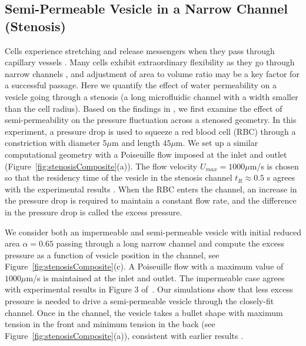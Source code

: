 \documentclass[9pt,twocolumn,twoside,lineno]{pnas-new}
\begin{document}
\subsection*{Semi-Permeable Vesicle in a Narrow Channel (Stenosis)}
Cells experience stretching and release messengers when they pass through capillary vessels \cite{Wan2008_PNAS,ForsythWan2011_PNAS,Pak2015_PNAS}.
Many cells exhibit extraordinary flexibility as they go through narrow channels \cite{AuStoreyMoore2016_PNAS}, and adjustment of area to volume ratio may be a key factor for a successful passage.
Here we quantify the effect of water permeability on a vesicle going through a stenosis (a long microfluidic channel with a width smaller than the cell radius).
Based on the findings in 
\cite{abk-fai-sto2006}, we first examine the effect of
semi-permeability on the pressure fluctuation across a stenosed
geometry. In this experiment, a pressure drop is used to squeeze a
red blood cell (RBC) through a constriction with diameter $5\mu$m and
length $45\mu$m. We set up a similar computational geometry with a
Poiseuille flow imposed at the inlet and outlet
(Figure~\ref{fig:stenosisComposite}(a)). The flow velocity $U_{max} = 1000 \mu$m/s is chosen so that
the residency time of the vesicle  in the stenosis channel $t_R \approx 0.5$ s agrees with the
experimental results \cite{abk-fai-sto2006}. When the RBC enters the channel, an increase in the pressure drop is required to maintain a constant flow
rate, and the difference in the pressure drop is called the excess
pressure. 

We consider both an impermeable and semi-permeable vesicle with initial
reduced area $\alpha = 0.65$ passing through a long narrow channel and
compute the excess pressure as a function of vesicle position in the
channel, see Figure~\ref{fig:stenosisComposite}(c). A 
Poiseuille flow with a maximum value of $1000 \mu$m/s is maintained
at the inlet and outlet. The impermeable case agrees with experimental
results in Figure 3 of~\cite{abk-fai-sto2006}. Our simulations show that
less excess pressure is needed to drive a semi-permeable vesicle through the closely-fit channel.
Once in the channel, the vesicle takes a bullet shape with maximum tension in the front and minimum tension in the back (see Figure~\ref{fig:stenosisComposite}(a)),
consistent with earlier results \cite{Pak2015_PNAS,HarmanBertrandJoos2017_CJP}.
\end{document}
